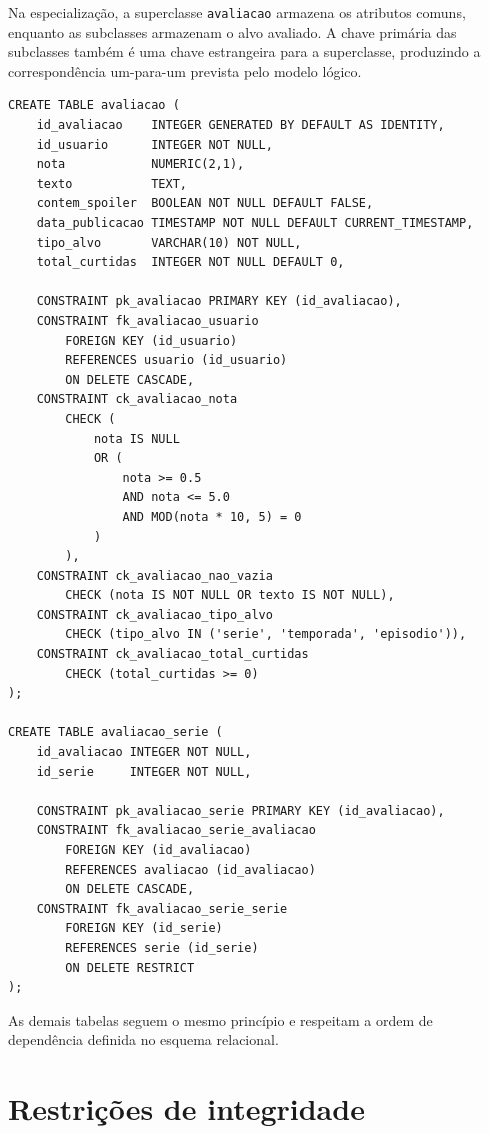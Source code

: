 \documentclass[a4paper,12pt,oneside,openany]{book}
\newcommand{\id}[1]{\texttt{#1}}
\begin{document}
Na especialização, a superclasse \id{avaliacao} armazena os atributos comuns,
enquanto as subclasses armazenam o alvo avaliado. A chave primária das subclasses
também é uma chave estrangeira para a superclasse, produzindo a correspondência
um-para-um prevista pelo modelo lógico.

\begin{lstlisting}[caption={Superclasse \id{avaliacao} e uma subclasse},label={lst:ddl-avaliacao}]
CREATE TABLE avaliacao (
    id_avaliacao    INTEGER GENERATED BY DEFAULT AS IDENTITY,
    id_usuario      INTEGER NOT NULL,
    nota            NUMERIC(2,1),
    texto           TEXT,
    contem_spoiler  BOOLEAN NOT NULL DEFAULT FALSE,
    data_publicacao TIMESTAMP NOT NULL DEFAULT CURRENT_TIMESTAMP,
    tipo_alvo       VARCHAR(10) NOT NULL,
    total_curtidas  INTEGER NOT NULL DEFAULT 0,

    CONSTRAINT pk_avaliacao PRIMARY KEY (id_avaliacao),
    CONSTRAINT fk_avaliacao_usuario
        FOREIGN KEY (id_usuario)
        REFERENCES usuario (id_usuario)
        ON DELETE CASCADE,
    CONSTRAINT ck_avaliacao_nota
        CHECK (
            nota IS NULL
            OR (
                nota >= 0.5
                AND nota <= 5.0
                AND MOD(nota * 10, 5) = 0
            )
        ),
    CONSTRAINT ck_avaliacao_nao_vazia
        CHECK (nota IS NOT NULL OR texto IS NOT NULL),
    CONSTRAINT ck_avaliacao_tipo_alvo
        CHECK (tipo_alvo IN ('serie', 'temporada', 'episodio')),
    CONSTRAINT ck_avaliacao_total_curtidas
        CHECK (total_curtidas >= 0)
);

CREATE TABLE avaliacao_serie (
    id_avaliacao INTEGER NOT NULL,
    id_serie     INTEGER NOT NULL,

    CONSTRAINT pk_avaliacao_serie PRIMARY KEY (id_avaliacao),
    CONSTRAINT fk_avaliacao_serie_avaliacao
        FOREIGN KEY (id_avaliacao)
        REFERENCES avaliacao (id_avaliacao)
        ON DELETE CASCADE,
    CONSTRAINT fk_avaliacao_serie_serie
        FOREIGN KEY (id_serie)
        REFERENCES serie (id_serie)
        ON DELETE RESTRICT
);
\end{lstlisting}

As demais tabelas seguem o mesmo princípio e respeitam a ordem de dependência
definida no esquema relacional.

\section{Restrições de integridade}
\end{document}
